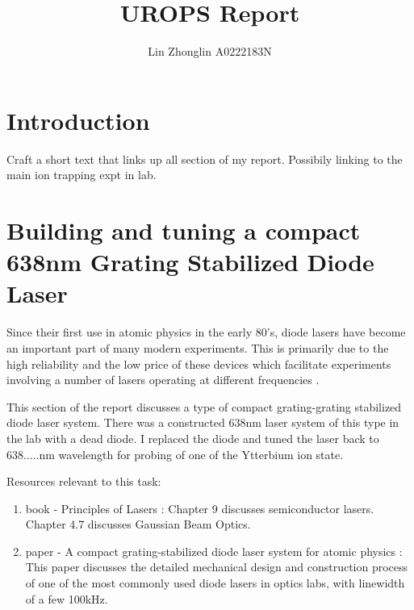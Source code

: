 \documentclass[11pt,A4Paper]{article}
\title{UROPS Report}
\author{Lin Zhonglin \hspace{1cm} A0222183N}
\begin{document}
\maketitle

\section{Introduction}
Craft a short text that links up all section of my report. Possibily linking to the main ion trapping expt in lab. 

\section{Building and tuning a compact 638nm Grating Stabilized Diode Laser}
Since their first use in atomic physics in the early 80's, diode lasers have become an important part of many modern experiments. This is primarily due to the high reliability and the low price of these devices which facilitate experiments involving a number of lasers operating at different frequencies \cite{compactGratingDiodeLaser}.
\par
This section of the report discusses a type of compact grating-grating stabilized diode laser system. There was a constructed 638nm laser system of this type in the lab with a dead diode. I replaced the diode and tuned the laser back to 638.....nm wavelength for probing of one of the Ytterbium ion state. 
\par
Resources relevant to this task: 
\begin{enumerate}
    \item book - Principles of Lasers \cite{principleOfLasersOrazio}: Chapter 9 discusses semiconductor lasers. Chapter 4.7 discusses Gaussian Beam Optics. 
    \item paper - A compact grating-stabilized diode laser system for atomic physics \cite{compactGratingDiodeLaser}: This paper discusses the detailed mechanical design and construction process of one of the most commonly used diode lasers in optics labs, with linewidth of a few 100kHz. 
\end{enumerate}

\end{document}
